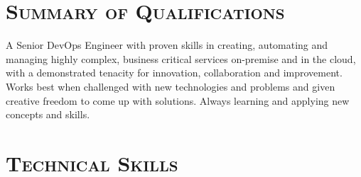 \documentclass[11pt,letter,roman]{moderncv}
\begin{document}
\makecvtitle{}
\vspace{-\baselineskip}

\section{\textsc{Summary of Qualifications}}
A Senior DevOps Engineer with proven skills in creating, automating and
managing highly complex, business critical services on-premise and in the
cloud, with a demonstrated tenacity for innovation, collaboration and
improvement. Works best when challenged with new technologies and problems and
given creative freedom to come up with solutions. Always learning and applying
new concepts and skills.

\section{\textsc{Technical Skills}}
\end{document}

